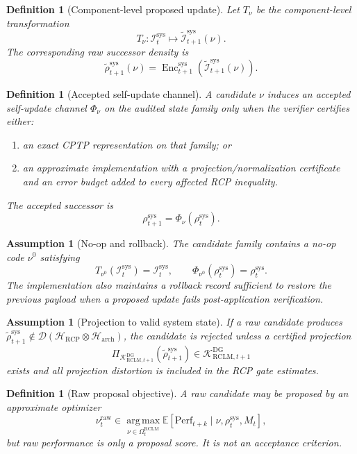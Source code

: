 \documentclass[11pt,a4paper]{article}
\newtheorem{definition}[theorem]{Definition}
\newtheorem{assumption}[theorem]{Assumption}
\newcommand{\D}{\mathcal D}
\newcommand{\Hcal}{\mathcal H}
\newcommand{\Kcal}{\mathcal K}
\newcommand{\argmax}{\operatorname*{arg\,max}}
\newcommand{\RCP}{\mathrm{RCP}}
\newcommand{\RCLM}{\mathrm{RCLM}}
\newcommand{\DG}{\mathrm{DG}}
\newcommand{\sys}{\mathrm{sys}}
\newcommand{\arch}{\mathrm{arch}}
\newcommand{\raw}{\mathrm{raw}}
\begin{document}
\begin{definition}[Component-level proposed update]
Let \(T_\nu\) be the component-level transformation
\[
T_\nu:\mathcal I_t^{\sys}\mapsto \widetilde{\mathcal I}_{t+1}^{\sys}(\nu).
\]
The corresponding raw successor density is
\[
\widetilde\rho_{t+1}^{\sys}(\nu)=\operatorname{Enc}_{t+1}^{\sys}(\widetilde{\mathcal I}_{t+1}^{\sys}(\nu)).
\]
\end{definition}

\begin{definition}[Accepted self-update channel]
A candidate \(\nu\) induces an accepted self-update channel \(\Phi_\nu\) on the audited state family only when the verifier certifies either:
\begin{enumerate}[label=(\alph*),leftmargin=1.5em]
    \item an exact CPTP representation on that family; or
    \item an approximate implementation with a projection/normalization certificate and an error budget added to every affected RCP inequality.
\end{enumerate}
The accepted successor is
\[
\rho_{t+1}^{\sys}=\Phi_{\nu}(\rho_t^{\sys}).
\]
\end{definition}

\begin{assumption}[No-op and rollback]
The candidate family contains a no-op code \(\nu^0\) satisfying
\[
T_{\nu^0}(\mathcal I_t^{\sys})=\mathcal I_t^{\sys},
\qquad
\Phi_{\nu^0}(\rho_t^{\sys})=\rho_t^{\sys}.
\]
The implementation also maintains a rollback record sufficient to restore the previous payload when a proposed update fails post-application verification.
\end{assumption}

\begin{assumption}[Projection to valid system state]
If a raw candidate produces \(\widetilde\rho_{t+1}^{\sys}\notin\D(\Hcal_{\RCP}\otimes\Hcal_{\arch})\), the candidate is rejected unless a certified projection
\[
\Pi_{\Kcal_{\RCLM,t+1}^{\DG}}(\widetilde\rho_{t+1}^{\sys})\in\Kcal_{\RCLM,t+1}^{\DG}
\]
exists and all projection distortion is included in the RCP gate estimates.
\end{assumption}

\begin{definition}[Raw proposal objective]
A raw candidate may be proposed by an approximate optimizer
\[
\nu_t^{\raw}\in\argmax_{\nu\in\Omega_t^{\RCLM}}
\mathbb E[\mathrm{Perf}_{t+k}\mid \nu,\rho_t^{\sys},M_t],
\]
but raw performance is only a proposal score.  It is not an acceptance criterion.
\end{definition}
\end{document}
